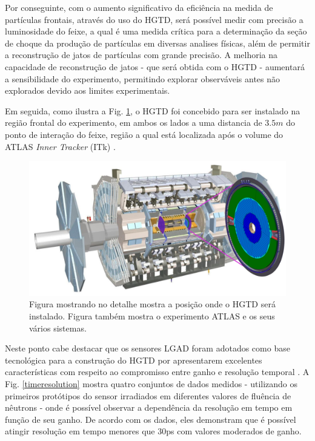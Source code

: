 Por conseguinte, com o aumento significativo da eficiência na medida de partículas frontais, através do uso do HGTD, será possível medir com precisão a luminosidade do feixe, a qual é uma medida crítica para a determinação da seção de choque da produção de partículas em diversas analises físicas, além de  permitir a reconstrução de jatos de partículas com grande precisão. A melhoria na capacidade de reconstrução de jatos - que será obtida com o HGTD - aumentará a sensibilidade do experimento, permitindo explorar observáveis antes não explorados devido aos limites experimentais.

Em seguida, como ilustra a Fig. \ref{hgtd}, o HGTD foi concebido para ser instalado na região frontal do experimento, em ambos os lados a uma distancia de $3.5m$ do ponto de interação do feixe, região a qual está localizada após o volume do ATLAS {\it Inner Tracker} (ITk) \cite{tdr}. 

\begin{figure} 
    \centering
    \includegraphics[width=15.0cm]{assets/ATLAS_HGTD.png}
    \caption{ Figura mostrando no detalhe mostra a posição onde o HGTD será instalado. Figura também mostra o experimento ATLAS e os seus vários sistemas.}
    \label{hgtd}
\end{figure}

Neste ponto cabe destacar que os sensores LGAD foram adotados como base tecnológica para a construção do HGTD por apresentarem excelentes características com respeito ao compromisso entre ganho e resolução temporal \cite{tdr,JIN_LGAD,NIMA_LGAD}. A Fig. \ref{timeresolution} mostra quatro conjuntos de dados medidos - utilizando os primeiros protótipos do sensor irradiados em  diferentes valores de fluência de nêutrons - onde é possível observar a dependência da resolução em tempo em função de seu ganho. De acordo com os dados, eles demonstram que é possível atingir resolução em tempo menores que 30ps com valores moderados de ganho.   

